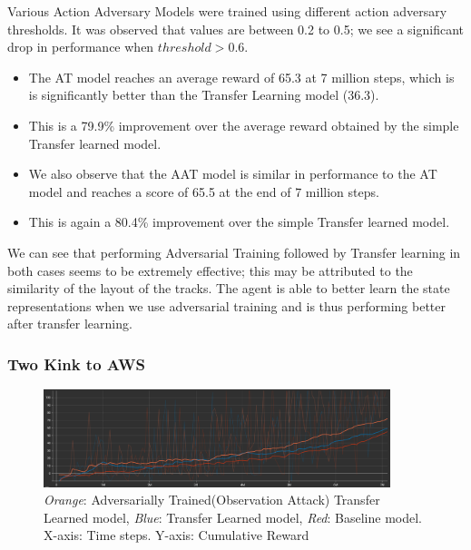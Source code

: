 

Various Action Adversary Models were trained using different action
adversary thresholds. It was observed that values are between 0.2 to
0.5; we see a significant drop in performance when $threshold > 0.6$.
\begin{itemize}
\item The AT model reaches an average reward of 65.3 at 7 million
  steps, which is is significantly better than the Transfer Learning
  model (36.3).
\item This is a 79.9\% improvement over the average reward obtained by
  the simple Transfer learned model.
\item We also observe that the AAT model is similar in performance to
  the AT model and reaches a score of 65.5 at the end of 7 million
  steps.
\item This is again a 80.4\% improvement over the simple Transfer
  learned model.
\end{itemize}
We can see that performing Adversarial Training followed by Transfer
learning in both cases seems to be extremely effective; this may be
attributed to the similarity of the layout of the tracks. The agent is
able to better learn the state representations when we use adversarial
training and is thus performing better after transfer learning.


\subsubsection{Two Kink to AWS }

\begin{figure}[H]
  \centering
  \includegraphics[width=0.9\textwidth]{images/graphs/AT-TL-TwoKink-AWSTrack-0.98.png}
  \caption{\textit{Orange}: Adversarially Trained(Observation Attack)
    Transfer Learned model, \textit{Blue}: Transfer Learned model,
    \textit{Red}: Baseline model. X-axis: Time steps. Y-axis:
    Cumulative Reward }
  \label{fig:my_label}
\end{figure}

